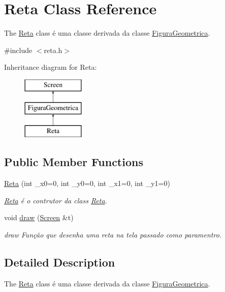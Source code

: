 \hypertarget{class_reta}{}\section{Reta Class Reference}
\label{class_reta}


The \mbox{\hyperlink{class_reta}{Reta}} class é uma classe derivada da classe \mbox{\hyperlink{class_figura_geometrica}{Figura\+Geometrica}}.  




{\ttfamily \#include $<$reta.\+h$>$}

Inheritance diagram for Reta\+:\begin{figure}[H]
\begin{center}
\leavevmode
\includegraphics[height=3.000000cm]{class_reta}
\end{center}
\end{figure}
\subsection*{Public Member Functions}
\begin{DoxyCompactItemize}
\item 
\mbox{\hyperlink{class_reta_a097fd952fee835799da0f3d79b926b56}{Reta}} (int \+\_\+x0=0, int \+\_\+y0=0, int \+\_\+x1=0, int \+\_\+y1=0)
\begin{DoxyCompactList}\small\item\em \mbox{\hyperlink{class_reta}{Reta}} é o contrutor da class \mbox{\hyperlink{class_reta}{Reta}}. \end{DoxyCompactList}\item 
void \mbox{\hyperlink{class_reta_ac2e9805183cd474b62bffd8b032cd780}{draw}} (\mbox{\hyperlink{class_screen}{Screen}} \&t)
\begin{DoxyCompactList}\small\item\em draw Função que desenha uma reta na tela passado como paramentro. \end{DoxyCompactList}\end{DoxyCompactItemize}


\subsection{Detailed Description}
The \mbox{\hyperlink{class_reta}{Reta}} class é uma classe derivada da classe \mbox{\hyperlink{class_figura_geometrica}{Figura\+Geometrica}}. 

